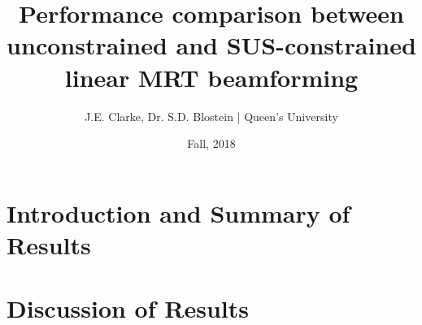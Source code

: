 \documentclass[11pt]{article}
\title{Performance comparison between unconstrained and SUS-constrained linear MRT beamforming}
\author{J.E. Clarke, Dr. S.D. Blostein | Queen's University}
\date{Fall, 2018}
\begin{document}
	\maketitle
	\newpage
	\section{Introduction and Summary of Results}
	    
	\section{Discussion of Results}
	    
%	    
%	    
%	    
    \newpage	
 	\begingroup
 		\renewcommand{\section}[2]{}%
 		
 	\endgroup
\end{document}
